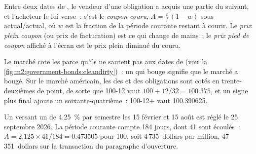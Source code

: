 \begin{definition}\label{def:m2:government-bonds:accrued}
Entre deux dates de , le vendeur d'une obligation a acquis une partie du
 suivant, et l'acheteur le lui verse~: c'est le \emph{coupon
couru}, $A = \frac{c}{f}\,(1 - w)$ sous
actual/actual, où $w$ est la fraction de la période courante restant à courir.
Le \emph{prix plein coupon} (ou prix de facturation) est ce qui
change de mains~; le \emph{prix pied de coupon} affiché à l'écran est
le prix plein  diminué du  couru.
\end{definition}

Le marché cote les  parce qu'ils ne sautent pas aux dates de 
(voir la \cref{fig:m2:government-bonds:cleandirty})~: un  qui bouge signifie
que le marché a bougé. Sur le marché américain, les  des  et des obligations
sont cotés en trente-deuxièmes de point, de sorte que 100-12 vaut $100 + 12/32 =
100.375$, et un signe plus final ajoute un soixante-quatrième~: 100-12+ vaut 100.390625.

\begin{example}\label{ex:m2:government-bonds:accrued}
Un  versant un  de 4.25~\% par semestre les 15 février et 15 août est réglé le 25
septembre 2026. La période courante compte 184 jours, dont 41 sont écoulés~:
$A = 2.125 \times 41/184 = 0.473505$ pour 100, soit 4\,735~dollars par million, 47\,351~dollars
sur la transaction du paragraphe d'ouverture.
\end{example}

